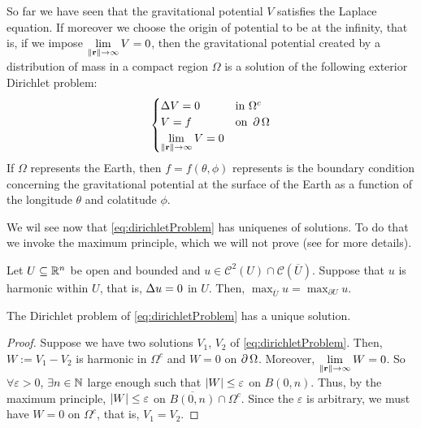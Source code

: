 \documentclass[../main.tex]{subfiles}
\begin{document}
So far we have seen that the gravitational potential $V$ satisfies the Laplace equation. If moreover we choose the origin of potential to be at the infinity, that is, if we impose $\displaystyle\lim_{\left\|\boldsymbol{\mathrm{r}}\right\|\to\infty}V=0$, then the gravitational potential created by a distribution of mass in a compact region $\Omega$ is a solution of the following exterior Dirichlet problem:
\begin{equation}\label{eq:dirichletProblem}
  \begin{cases}
    \Delta V = 0 & \text{in } \Omega^c    \\
    V = f            & \text{on } \operatorname{\partial}{\Omega} \\
    \displaystyle\lim_{\left\|\boldsymbol{\mathrm{r}}\right\|\to\infty}V=0
  \end{cases}
\end{equation}
If $\Omega$ represents the Earth, then $f=f(\theta,\phi)$ represents is the boundary condition concerning the gravitational potential at the surface of the Earth as a function of the longitude $\theta$ and colatitude $\phi$.

We wil see now that \cref{eq:dirichletProblem} has uniquenes of solutions. To do that we invoke the maximum principle, which we will not prove  (see \cite{evans} for more details).
\begin{theorem}
  Let $U\subseteq \mathbb{R}^n$ be open and bounded and $u\in\mathcal{C}^2(U)\cap \mathcal{C}(\overline{U})$. Suppose that $u$ is harmonic within $U$, that is, $\Delta u=0$ in $U$. Then, $\max_{\overline{U}}u=\max_{\partial U}u$.
\end{theorem}
\begin{corollary}
  The Dirichlet problem of \cref{eq:dirichletProblem} has a unique solution.
\end{corollary}
\begin{proof}
  Suppose we have two solutions $V_1$, $V_2$ of \cref{eq:dirichletProblem}. Then, $W:=V_1-V_2$ is harmonic in $\Omega^c$ and $W=0$ on $\operatorname{\partial}{\Omega}$. Moreover, $\displaystyle\lim_{\left\|\boldsymbol{\mathrm{r}}\right\|\to\infty}W=0$. So $\forall\varepsilon>0$, $\exists n\in\mathbb{N}$ large enough such that $\abs{W}\leq \varepsilon$ on $B(0,n)$. Thus, by the maximum principle, $\abs{W}\leq \varepsilon$ on $\overline{B(0,n)}\cap \Omega^c$. Since the $\varepsilon$ is arbitrary, we must have $W=0$ on $\Omega^c$, that is, $V_1=V_2$.
\end{proof}
\end{document}
